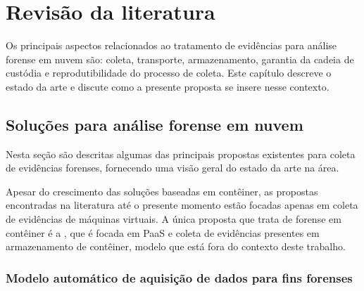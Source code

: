 \chapter{Revisão da literatura}
\label{chp:revisão}

Os principais aspectos relacionados ao tratamento de evidências para análise forense em nuvem são: coleta, transporte, armazenamento, garantia da cadeia de custódia e reprodutibilidade do processo de coleta. 
%
Este capítulo descreve o estado da arte e discute como a presente proposta se insere nesse contexto.


\section{Soluções para análise forense em nuvem}
\label{sec:estadodaarte}


Nesta seção são descritas algumas das principais propostas existentes para coleta de evidências forenses, fornecendo uma visão geral do estado da arte na área.
%

Apesar do crescimento das soluções baseadas em contêiner, as propostas encontradas na literatura até o presente momento estão focadas apenas em coleta de evidências de máquinas virtuais.
%
A única proposta que trata de forense em contêiner é a \cite{ContainerForensicsPaaS2016}, que é focada em PaaS e coleta de evidências presentes em armazenamento de contêiner, modelo que está fora do contexto deste trabalho.

\subsection{Modelo automático de aquisição de dados para fins forenses}
\label{sec:aquisicaoautomatica}


